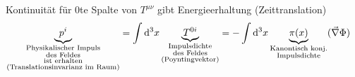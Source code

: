 	Kontinuität für 0te Spalte von $T^{\mu \nu}$ gibt Energieerhaltung (Zeittranslation)
	\begin{align*}
		\underbrace{p^i}_{\substack{\text{Physikalischer Impuls} \\ \text{des Feldes} \\ \text{ist erhalten} \\ \text{(Translationsinvarianz im Raum)}}} &= \int \mathrm{d}^3 x 
		\underbrace{T^{0 i}}_{\substack{\text{Impulsdichte} \\ \text{des Feldes} \\
				\text{(Poyntingvektor)}}}
		= - \int \mathrm{d}^3 x \underbrace{\pi(x)}_{\substack{\text{Kanontisch konj.} \\ \text{Impulsdichte}}} (\vec{\nabla}\Phi)
	\end{align*}